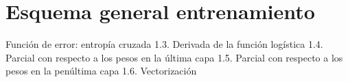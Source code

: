 \section{Esquema general entrenamiento}

Función de error: entropía cruzada
1.3. Derivada de la función logística
1.4. Parcial con respecto a los pesos en la última capa
1.5. Parcial con respecto a los pesos en la penúltima capa
1.6. Vectorización
